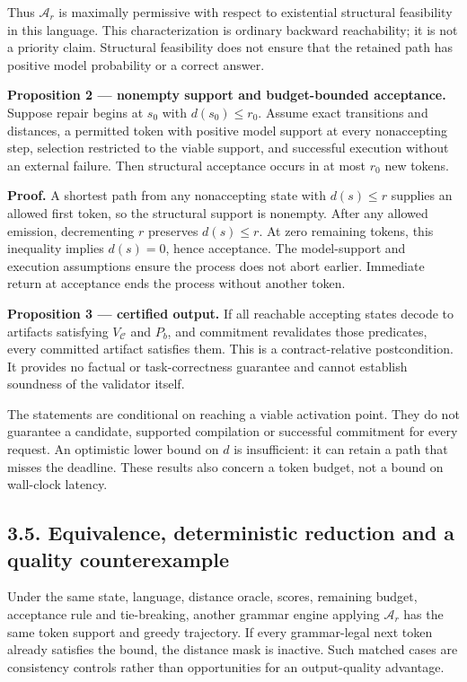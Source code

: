 \documentclass[
  12pt,
  a4paper,
]{article}
\begin{document}
Thus \(\mathcal A_r\) is maximally permissive with respect to
existential structural feasibility in this language. This
characterization is ordinary backward reachability; it is not a priority
claim. Structural feasibility does not ensure that the retained path has
positive model probability or a correct answer.

\textbf{Proposition 2 --- nonempty support and budget-bounded
acceptance.} Suppose repair begins at \(s_0\) with \(d(s_0)\le r_0\).
Assume exact transitions and distances, a permitted token with positive
model support at every nonaccepting step, selection restricted to the
viable support, and successful execution without an external failure.
Then structural acceptance occurs in at most \(r_0\) new tokens.

\textbf{Proof.} A shortest path from any nonaccepting state with
\(d(s)\le r\) supplies an allowed first token, so the structural support
is nonempty. After any allowed emission, decrementing \(r\) preserves
\(d(s)\le r\). At zero remaining tokens, this inequality implies
\(d(s)=0\), hence acceptance. The model-support and execution
assumptions ensure the process does not abort earlier. Immediate return
at acceptance ends the process without another token.

\textbf{Proposition 3 --- certified output.} If all reachable accepting
states decode to artifacts satisfying \(V_{\mathcal C}\) and \(P_b\),
and commitment revalidates those predicates, every committed artifact
satisfies them. This is a contract-relative postcondition. It provides
no factual or task-correctness guarantee and cannot establish soundness
of the validator itself.

The statements are conditional on reaching a viable activation point.
They do not guarantee a candidate, supported compilation or successful
commitment for every request. An optimistic lower bound on \(d\) is
insufficient: it can retain a path that misses the deadline. These
results also concern a token budget, not a bound on wall-clock latency.

\subsection{3.5. Equivalence, deterministic reduction and a quality
counterexample}\label{equivalence-deterministic-reduction-and-a-quality-counterexample}

Under the same state, language, distance oracle, scores, remaining
budget, acceptance rule and tie-breaking, another grammar engine
applying \(\mathcal A_r\) has the same token support and greedy
trajectory. If every grammar-legal next token already satisfies the
bound, the distance mask is inactive. Such matched cases are consistency
controls rather than opportunities for an output-quality advantage.
\end{document}
